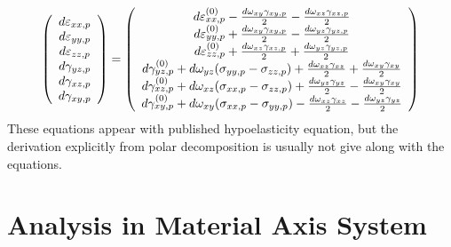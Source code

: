 \documentclass[11pt]{book}
\begin{document}
\begin{equation}
   \left(\begin{array}{c} d\varepsilon_{xx,p} \\ d\varepsilon_{yy,p} \\ d\varepsilon_{zz,p} \\ 
   						d\gamma_{yz,p} \\ d\gamma_{xz,p} \\ d\gamma_{xy,p} \end{array}\right) = 
   \left(\begin{array}{c} d\varepsilon_{xx,p}^{(0)} - {d\omega_{xy}\gamma_{xy,p}\over2} - {d\omega_{xz}\gamma_{xz,p}\over2} \\
                d\varepsilon_{yy,p}^{(0)} + {d\omega_{xy}\gamma_{xy,p}\over2} - {d\omega_{yz}\gamma_{yz,p}\over2} \\
                d\varepsilon_{zz,p}^{(0)} + {d\omega_{xz}\gamma_{xz,p}\over2} + {d\omega_{yz}\gamma_{yz,p}\over2} \\
                d\gamma_{yz,p}^{(0)} + {d\omega_{yz}}(\sigma_{yy,p}-\sigma_{zz,p})
                      + {d\omega_{xz}\gamma_{xz}\over 2} + {d\omega_{xy}\gamma_{xy}\over 2}   \\
                d\gamma_{xz,p}^{(0)} + {d\omega_{xz}}(\sigma_{xx,p}-\sigma_{zz,p})
                      + {d\omega_{yz}\gamma_{yz}\over 2} - {d\omega_{xy}\gamma_{xy}\over 2}   \\
                d\gamma_{xy,p}^{(0)} + {d\omega_{xy}}(\sigma_{xx,p}-\sigma_{yy,p})
                      - {d\omega_{xz}\gamma_{xz}\over 2} - {d\omega_{yz}\gamma_{yz}\over 2}
           \end{array}\right)
\end{equation}
These equations appear with published hypoelasticity equation, but the derivation explicitly from polar decomposition is usually not give along with the equations.

\section{Analysis in Material Axis System}
\end{document}
